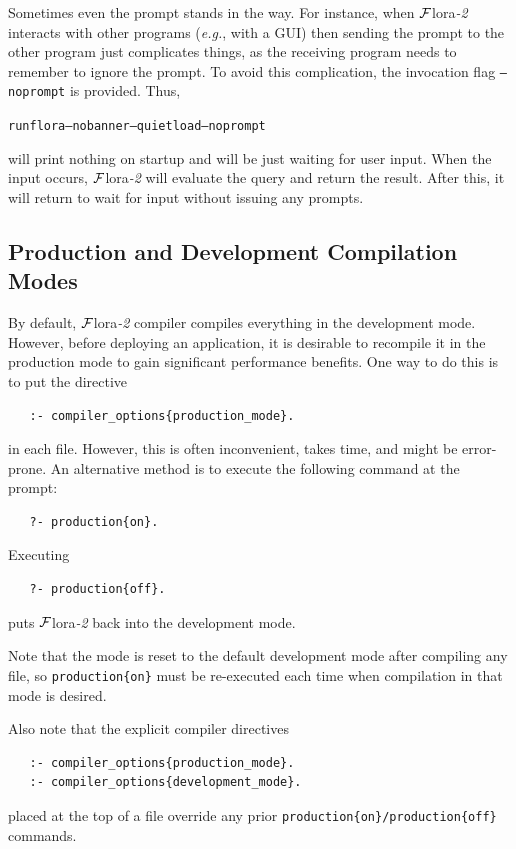 \documentclass[11pt]{article}
\newcommand{\FLSYSTEM}{{\mbox{\sc ${\cal F}${lora}\rm\emph{-2}}}\xspace}
\newcommand{\ENGINERUN}{runflora}
\begin{document}
Sometimes even the prompt stands in the way. For instance, when \FLSYSTEM
interacts with other programs ({\it e.g.}, with a GUI) then sending the
prompt to the other program just complicates things, as the receiving
program needs to remember to ignore the prompt. To avoid this complication,
the invocation flag {\tt --noprompt} is provided. Thus,
\begin{alltt}
 \ENGINERUN --nobanner --quietload --noprompt
\end{alltt}
will print nothing on startup and will be just waiting for user input. When
the input occurs, \FLSYSTEM will evaluate the query and return the result.
After this, it will return to wait for input without issuing any
prompts.

\subsection{Production and Development Compilation  Modes}
\label{sec-production-shell}

By default, \FLSYSTEM compiler compiles everything in the development
mode. However, before deploying an application, it is desirable to
recompile it in the production mode to gain significant performance benefits.
One way to do this is to put the directive
\begin{verbatim}
   :- compiler_options{production_mode}.
\end{verbatim}
in each file. However, this is often inconvenient, takes time, and might be
error-prone. An alternative method is to execute the following command at
the prompt:
\begin{verbatim}
   ?- production{on}.
\end{verbatim}
Executing
\begin{verbatim}
   ?- production{off}.
\end{verbatim}
puts \FLSYSTEM back into the development mode.

Note that the mode is reset to the default development mode after compiling
any file, so \texttt{production\{on\}} must be re-executed each time
when compilation in that mode is desired.

Also note that the explicit compiler directives
\begin{verbatim}
   :- compiler_options{production_mode}.
   :- compiler_options{development_mode}.
\end{verbatim}
placed at the top of a file override any prior
\texttt{production\{on\}/production\{off\}} commands. 
 
\end{document}
